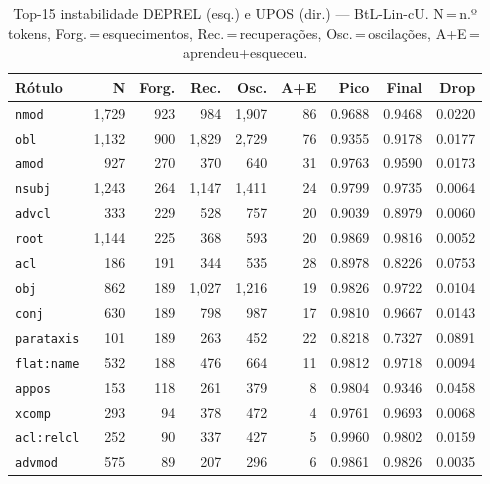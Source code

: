 

\begin{table}[ht]
\centering
\caption{Top-15 instabilidade DEPREL (esq.) e UPOS (dir.) --- BtL-Lin-cU. N\,=\,n.º tokens, Forg.\,=\,esquecimentos, Rec.\,=\,recuperações, Osc.\,=\,oscilações, A+E\,=\,aprendeu+esqueceu.}
\label{tab:inst-predictions-results-bertimbau-large-linear}
\begin{minipage}[t]{0.54\linewidth}
\centering\tiny
\begin{tabular}{lrrrrrrrr}
\toprule
\textbf{Rótulo} & \textbf{N} & \textbf{Forg.} & \textbf{Rec.} & \textbf{Osc.} & \textbf{A+E} & \textbf{Pico} & \textbf{Final} & \textbf{Drop} \\
\midrule
\texttt{nmod} & 1,729 & 923 & 984 & 1,907 & 86 & 0.9688 & 0.9468 & 0.0220 \\
\texttt{obl} & 1,132 & 900 & 1,829 & 2,729 & 76 & 0.9355 & 0.9178 & 0.0177 \\
\texttt{amod} & 927 & 270 & 370 & 640 & 31 & 0.9763 & 0.9590 & 0.0173 \\
\texttt{nsubj} & 1,243 & 264 & 1,147 & 1,411 & 24 & 0.9799 & 0.9735 & 0.0064 \\
\texttt{advcl} & 333 & 229 & 528 & 757 & 20 & 0.9039 & 0.8979 & 0.0060 \\
\texttt{root} & 1,144 & 225 & 368 & 593 & 20 & 0.9869 & 0.9816 & 0.0052 \\
\texttt{acl} & 186 & 191 & 344 & 535 & 28 & 0.8978 & 0.8226 & 0.0753 \\
\texttt{obj} & 862 & 189 & 1,027 & 1,216 & 19 & 0.9826 & 0.9722 & 0.0104 \\
\texttt{conj} & 630 & 189 & 798 & 987 & 17 & 0.9810 & 0.9667 & 0.0143 \\
\texttt{parataxis} & 101 & 189 & 263 & 452 & 22 & 0.8218 & 0.7327 & 0.0891 \\
\texttt{flat\!:\!name} & 532 & 188 & 476 & 664 & 11 & 0.9812 & 0.9718 & 0.0094 \\
\texttt{appos} & 153 & 118 & 261 & 379 & 8 & 0.9804 & 0.9346 & 0.0458 \\
\texttt{xcomp} & 293 & 94 & 378 & 472 & 4 & 0.9761 & 0.9693 & 0.0068 \\
\texttt{acl\!:\!relcl} & 252 & 90 & 337 & 427 & 5 & 0.9960 & 0.9802 & 0.0159 \\
\texttt{advmod} & 575 & 89 & 207 & 296 & 6 & 0.9861 & 0.9826 & 0.0035 \\
\bottomrule
\end{tabular}
\end{minipage}

\end{table}
